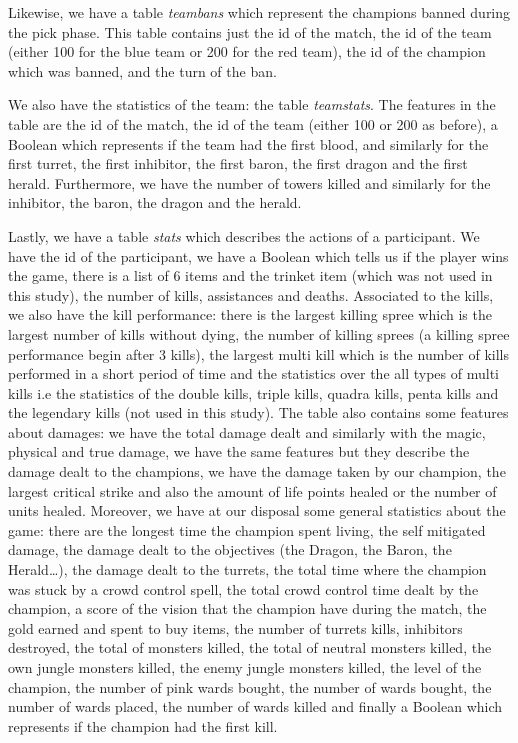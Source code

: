 \documentclass{article}
\begin{document}
Likewise, we have a table \emph{teambans} which represent the champions banned during the pick phase. This table contains just the id of the match, the id of the team (either 100 for the blue team or 200 for the red team), the id of the champion which was banned, and the turn of the ban.

We also have the statistics of the team: the table \emph{teamstats}. The features in the table are the id of the match, the id of the team (either 100 or 200 as before), a Boolean which represents if the team had the first blood, and similarly for the first turret, the first inhibitor, the first baron, the first dragon and the first herald. Furthermore, we have the number of towers killed and similarly for the inhibitor, the baron, the dragon and the herald.

Lastly, we have a table \emph{stats} which describes the actions of a participant. We have the id of the participant, we have a Boolean which tells us if the player wins the game, there is a list of 6 items and the trinket item (which was not used in this study), the number of kills, assistances and deaths. Associated to the kills, we also have the kill performance: there is the largest killing spree which is the largest number of kills without dying, the number of killing sprees (a killing spree performance begin after 3 kills), the largest multi kill which is the number of kills performed in a short period of time and the statistics over the all types of multi kills i.e the statistics of the double kills, triple kills, quadra kills, penta kills and the legendary kills (not used in this study). The table also contains some features about damages: we have the total damage dealt and similarly with the magic, physical and true damage, we have the same features but they describe the damage dealt to the champions, we have the damage taken by our champion, the largest critical strike and also the amount of life points healed or the number of units healed. 
Moreover, we have at our disposal some general statistics about the game: there are the longest time the champion spent living, the self mitigated damage, the damage dealt to the objectives (the Dragon, the Baron, the Herald\ldots), the damage dealt to the turrets, the total time where the champion was stuck by a crowd control spell, the total crowd control time dealt by the champion, a score of the vision that the champion have during the match, the gold earned and spent to buy items, the number of turrets kills, inhibitors destroyed, the total of monsters killed, the total of neutral monsters killed, the own jungle monsters killed, the enemy jungle monsters killed, the level of the champion, the number of pink wards bought, the number of wards bought, the number of wards placed, the number of wards killed and finally a Boolean which represents if the champion had the first kill.
\end{document}
